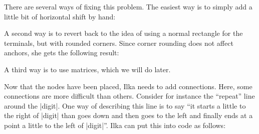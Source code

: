 There are several ways of fixing this problem. The easiest way is to simply add
a little bit of horizontal shift by hand:
%
\begin{codeexample}[preamble={\usetikzlibrary{positioning,shapes.misc}}]
\end{codeexample}

A second way is to revert back to the idea of using a normal rectangle for the
terminals, but with rounded corners. Since corner rounding does not affect
anchors, she gets the following result:
%
\begin{codeexample}[preamble={\usetikzlibrary{positioning,shapes.misc}}]
\end{codeexample}
%
A third way is to use matrices, which we will do later.

Now that the nodes have been placed, Ilka needs to add connections. Here, some
connections are more difficult than others. Consider for instance the
``repeat'' line around the |digit|. One way of describing this line is to say
``it starts a little to the right of |digit| than goes down and then goes to
the left and finally ends at a point a little to the left of |digit|''. Ilka
can put this into code as follows:
%
\begin{codeexample}[preamble={\usetikzlibrary{calc,positioning,shapes.misc}}]
\end{codeexample}

